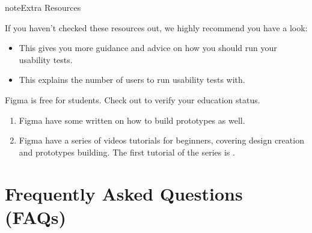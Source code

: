 \documentclass[letterpaper,10pt,english]{jupyterBook}
\begin{document}
\begin{sphinxadmonition}{note}{Extra Resources}

\sphinxAtStartPar
If you haven’t checked these resources out, we highly recommend you have a look:
\begin{itemize}
\item {} 
\sphinxAtStartPar
This  gives you more guidance
and advice on how you should run your usability tests.

\item {} 
\sphinxAtStartPar
This  explains the number
of users to run usability tests with.

\end{itemize}

\sphinxAtStartPar
Figma is free for students. Check out  to verify your education
status.
\begin{enumerate}
%
\item {} 
\sphinxAtStartPar
Figma have some written  on how to build prototypes as well.

\item {} 
\sphinxAtStartPar
Figma have a series of videos tutorials for beginners, covering design creation and prototypes building. The first tutorial of the series is .

\end{enumerate}
\end{sphinxadmonition}


\part{Frequently Asked Questions (FAQs)}







\renewcommand{\indexname}{Index}
\printindex
\end{document}
